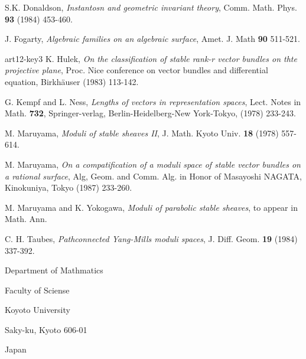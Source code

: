\begin{thebibliography}{99}
 S.K. Donaldson, \textit{Instantosn and geometric invariant theory}, Comm. Math. Phys. {\bf 93} (1984) 453-460.

 J. Fogarty, \textit{Algebraic families on an algebraic surface}, Amet. J. Math {\bf 90} 511-521.

\item {art12-key3} K. Hulek, \textit{On the classification of stable rank-r vector bundles on thte projective plane}, Proc. Nice conference on vector bundles and differential equation, Birkh\"auser (1983) 113-142.

 G. Kempf and L. Ness, \textit{Lengths of vectors in  representation spaces}, Lect. Notes in Math.
{\bf 732}, Springer-verlag, Berlin-Heidelberg-New York-Tokyo, (1978) 233-243.

 M. Maruyama, \textit{Moduli of stable sheaves II}, J. Math. Kyoto Univ. {\bf 18}
(1978) 557-614.

 M. Maruyama, \textit{On a compatification of a moduli space of stable vector bundles on a rational surface}, Alg, Geom. and Comm. Alg. in Honor of Masayoshi NAGATA, Kinokuniya, Tokyo (1987) 233-260.

 M. Maruyama and K. Yokogawa, \textit{Moduli of parabolic stable sheaves}, to appear in Math. Ann.

 C. H. Taubes, \textit{Pathconnected Yang-Mills moduli spaces}, J. Diff. Geom. {\bf 19} (1984) 337-392.
\end{thebibliography}
\begin{flushleft}
Department of Mathmatics

Faculty of Sciense

Koyoto University

Saky-ku, Kyoto 606-01

Japan
\end{flushleft}




